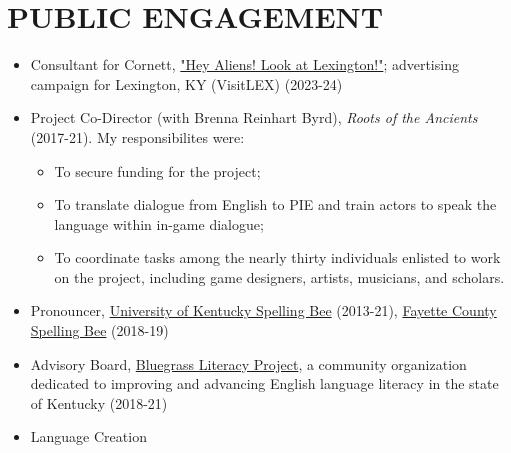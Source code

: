 \documentclass[paper=letter,fontsize=11pt,enabledeprecatedfontcommands]{scrartcl} %
\newcommand{\NewPart}[2]{\section*{\uppercase{#1} #2}}
\begin{document}
\NewPart{Public Engagement}{}
\begin{itemize}

\item Consultant for Cornett, \href{https://www.visitlex.com/aliens/}{"Hey Aliens! Look at Lexington!"}; advertising campaign for Lexington, KY (VisitLEX) (2023-24)

\item Project Co-Director (with Brenna Reinhart Byrd), \textit{Roots of the Ancients} (2017-21). My responsibilites were:

\begin{itemize}
    \item To secure funding for the  project;
    \item To translate dialogue from English to PIE and train actors to speak the language within in-game dialogue;
    \item To coordinate tasks among the nearly thirty individuals enlisted to work on the project, including game designers, artists, musicians, and scholars.
\end{itemize}
\item Pronouncer,  \href{https://ci.uky.edu/jam/scripps-howard-first-amendment-center}{University of Kentucky Spelling Bee} (2013-21), \href{http://www.fayettecofarmbureau.com/2018-fayette-county-farm-bureau-spelling-bee/}{Fayette County Spelling Bee} (2018-19)

\item Advisory Board, \href{https://thewordexplorer.blog/2018/01/10/bluegrass-literacy-project/}{Bluegrass Literacy Project}, a community organization dedicated to improving and advancing English language literacy in the state of Kentucky (2018-21)

\item{Language Creation}
\end{itemize}
\end{document}
